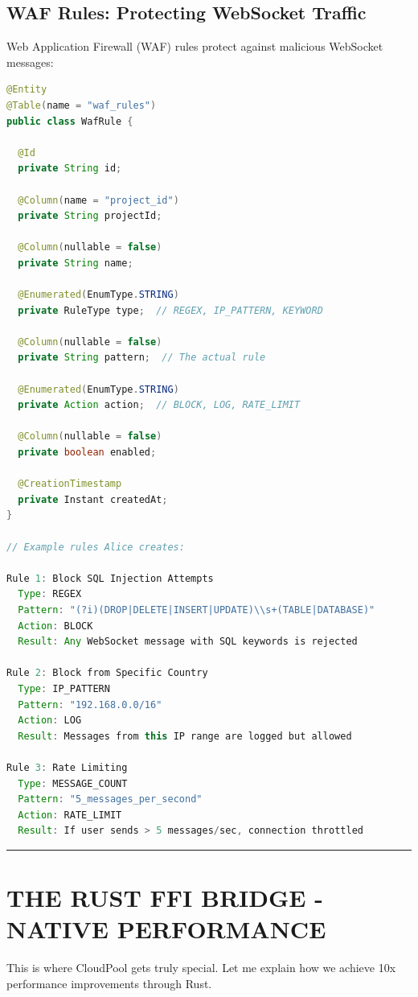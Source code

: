 \documentclass[11pt,a4paper]{report}
\begin{document}
\chapter{WAF Rules: Protecting WebSocket Traffic}


Web Application Firewall (WAF) rules protect against malicious WebSocket messages:

\begin{lstlisting}[language=Java]
@Entity
@Table(name = "waf_rules")
public class WafRule {
  
  @Id
  private String id;
  
  @Column(name = "project_id")
  private String projectId;
  
  @Column(nullable = false)
  private String name;
  
  @Enumerated(EnumType.STRING)
  private RuleType type;  // REGEX, IP_PATTERN, KEYWORD
  
  @Column(nullable = false)
  private String pattern;  // The actual rule
  
  @Enumerated(EnumType.STRING)
  private Action action;  // BLOCK, LOG, RATE_LIMIT
  
  @Column(nullable = false)
  private boolean enabled;
  
  @CreationTimestamp
  private Instant createdAt;
}

// Example rules Alice creates:

Rule 1: Block SQL Injection Attempts
  Type: REGEX
  Pattern: "(?i)(DROP|DELETE|INSERT|UPDATE)\\s+(TABLE|DATABASE)"
  Action: BLOCK
  Result: Any WebSocket message with SQL keywords is rejected

Rule 2: Block from Specific Country
  Type: IP_PATTERN
  Pattern: "192.168.0.0/16"
  Action: LOG
  Result: Messages from this IP range are logged but allowed

Rule 3: Rate Limiting
  Type: MESSAGE_COUNT
  Pattern: "5_messages_per_second"
  Action: RATE_LIMIT
  Result: If user sends > 5 messages/sec, connection throttled
\end{lstlisting}


\vfill\hrule\vfill



\part{THE RUST FFI BRIDGE - NATIVE PERFORMANCE}


This is where CloudPool gets truly special. Let me explain how we achieve 10x performance improvements through Rust.
\end{document}
